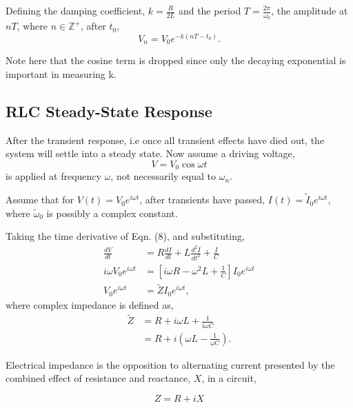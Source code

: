 \documentclass{article}
\begin{document}
Defining the damping coefficient, $k=\frac{R}{2L}$ and the period
$T = \frac{2\pi}{\omega_0}$, the amplitude at $nT$, where $n \in 
\mathbb{Z}^{+}$, after $t_0$,
\begin{equation}
    V_n=V_0e^{-k(nT-t_0)}.
\end{equation}

Note here that the cosine term is dropped since only the decaying 
exponential is important in measuring k.

\subsection{RLC Steady-State Response}
After the transient response, i.e once all transient effects have
died out, the system will settle into a steady state. Now assume 
a driving voltage,
\begin{equation}
    V = V_0\cos{\omega t}
\end{equation}
is applied at frequency $\omega$, not necessarily equal to $\omega_n$.

Assume that for $V(t) = V_0e^{i\omega t}$, after transients have passed,
$I(t) = \tilde{I}_0e^{i\omega t}$, where $\tilde{\omega}_0$ is possibly
a complex constant.

Taking the time derivative of Eqn. (8), and substituting,
\begin{equation}
    \begin{split}
        \frac{dV}{dt}&=R\frac{dI}{dt}+L\frac{d^2I}{dt^2}+\frac{I}{C} \\
        i\omega V_0 e^{i\omega t} &=[i\omega R - \omega^2 L + 
        \frac{1}{C}]I_0e^{i\omega t} \\
        V_0 e^{i\omega t} &= \tilde{Z} I_0 e^{i\omega t},
    \end{split}
\end{equation}
where complex impedance is defined as,
\begin{equation}
    \begin{split}
        \tilde{Z} &= R + i\omega L + \frac{1}{i\omega C} \\
        &= R + i(\omega L - \frac{1}{\omega C}).
    \end{split}
\end{equation}

Electrical impedance is the opposition to alternating current
presented by the combined effect of resistance and reactance, $X$, 
in a circuit,

\begin{equation}
    Z = R + iX
\end{equation}
\end{document}
